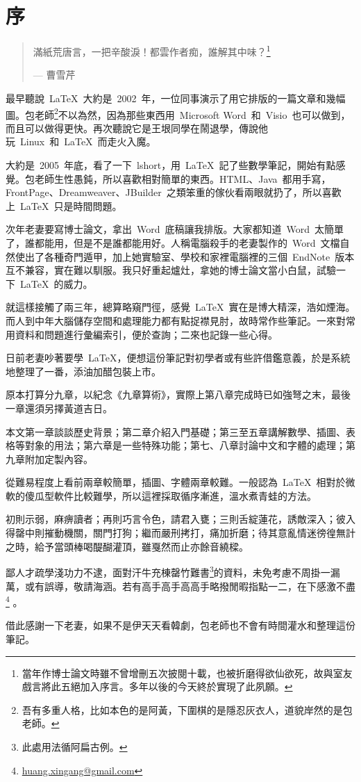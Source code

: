 \chapter{序}

\begin{quotation}
滿紙荒唐言，一把辛酸淚！都雲作者痴，誰解其中味？\footnote{當年作博士論文時雖不曾增刪五次披閱十載，也被折磨得欲仙欲死，故與室友戲言將此五絕加入序言。多年以後的今天終於實現了此夙願。}
\begin{flushright}
--- 曹雪芹
\end{flushright}
\end{quotation}

最早聽說~\LaTeX~大約是~2002~年，一位同事演示了用它排版的一篇文章和幾幅圖。包老師\footnote{吾有多重人格，比如本色的是阿黃，下圍棋的是隱忍灰衣人，道貌岸然的是包老師。}不以為然，因為那些東西用~Microsoft Word~和~Visio~也可以做到，而且可以做得更快。再次聽說它是王垠同學在鬧退學，傳說他玩~Linux~和~\LaTeX~而走火入魔。

大約是~2005~年底，看了一下~lshort，用~\LaTeX~記了些數學筆記，開始有點感覺。包老師生性愚鈍，所以喜歡相對簡單的東西。HTML、Java~都用手寫，FrontPage、Dreamweaver、JBuilder~之類笨重的傢伙看兩眼就扔了，所以喜歡上~\LaTeX~只是時間問題。

次年老妻要寫博士論文，拿出~Word~底稿讓我排版。大家都知道~Word~太簡單了，誰都能用，但是不是誰都能用好。人稱電腦殺手的老妻製作的~Word~文檔自然使出了各種奇門遁甲，加上她實驗室、學校和家裡電腦裡的三個~EndNote~版本互不兼容，實在難以馴服。我只好重起爐灶，拿她的博士論文當小白鼠，試驗一下~\LaTeX~的威力。

就這樣接觸了兩三年，總算略窺門徑，感覺~\LaTeX~實在是博大精深，浩如煙海。而人到中年大腦儲存空間和處理能力都有點捉襟見肘，故時常作些筆記。一來對常用資料和問題進行彙編索引，便於查詢；二來也記錄一些心得。

日前老妻吵著要學~\LaTeX，便想這份筆記對初學者或有些許借鑑意義，於是系統地整理了一番，添油加醋包裝上市。

原本打算分九章，以紀念《九章算術》，實際上第八章完成時已如強弩之末，最後一章還須另擇黃道吉日。

本文第一章談談歷史背景；第二章介紹入門基礎；第三至五章講解數學、插圖、表格等對象的用法；第六章是一些特殊功能；第七、八章討論中文和字體的處理；第九章附加定製內容。

從難易程度上看前兩章較簡單，插圖、字體兩章較難。一般認為~\LaTeX~相對於微軟的傻瓜型軟件比較難學，所以這裡採取循序漸進，溫水煮青蛙的方法。

初則示弱，麻痹讀者；再則巧言令色，請君入甕；三則舌綻蓮花，誘敵深入；彼入得罄中則摧動機關，關門打狗；繼而嚴刑拷打，痛加折磨；待其意亂情迷徬徨無計之時，給予當頭棒喝醍醐灌頂，雖戛然而止亦餘音繞樑。

鄙人才疏學淺功力不逮，面對汗牛充棟罄竹難書\footnote{此處用法循阿扁古例。}的資料，未免考慮不周掛一漏萬，或有誤導，敬請海涵。若有高手高手高高手略撥閒暇指點一二，在下感激不盡\footnote{\href{mailto:huang.xingang@gmail.com}{huang.xingang@gmail.com}}
。

借此感謝一下老妻，如果不是伊天天看韓劇，包老師也不會有時間灌水和整理這份筆記。

